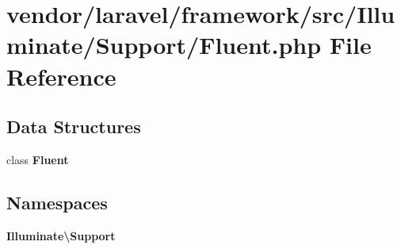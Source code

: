 \section{vendor/laravel/framework/src/\+Illuminate/\+Support/\+Fluent.php File Reference}
\label{_fluent_8php}
\subsection*{Data Structures}
\begin{DoxyCompactItemize}
\item 
class {\bf Fluent}
\end{DoxyCompactItemize}
\subsection*{Namespaces}
\begin{DoxyCompactItemize}
\item 
 {\bf Illuminate\textbackslash{}\+Support}
\end{DoxyCompactItemize}
